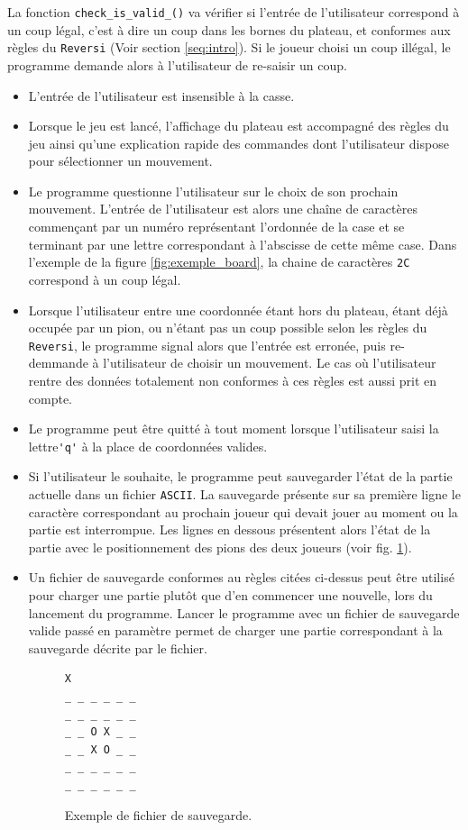 \documentclass[10pt,a4paper]{article}
\begin{document}
La fonction \verb!check_is_valid_()! va vérifier si l'entrée de l'utilisateur correspond à un coup légal, c'est à dire un coup dans les bornes du plateau, et conformes aux règles du \verb!Reversi! (Voir section \ref{seq:intro}). Si le joueur choisi un coup illégal, le programme demande alors à l'utilisateur de re-saisir un coup.\\

\begin{itemize}
\item L'entrée de l'utilisateur est insensible à la casse.
\item Lorsque le jeu est lancé, l'affichage du plateau est accompagné des règles du jeu ainsi qu'une explication rapide des commandes dont l'utilisateur dispose pour sélectionner un mouvement.
\item Le programme questionne l'utilisateur sur le choix de son prochain mouvement. L'entrée de l'utilisateur est alors une chaîne de caractères commençant par un numéro représentant l'ordonnée de la case et se terminant par une lettre correspondant à l'abscisse de cette même case. Dans l'exemple de la figure \ref{fig:exemple_board}, la chaine de caractères \verb!2C! correspond à un coup légal.
\item Lorsque l'utilisateur entre une coordonnée étant hors du plateau, étant déjà occupée par un pion, ou n'étant pas un coup possible selon les règles du \verb!Reversi!, le programme signal alors que l'entrée est erronée, puis re-demmande à l'utilisateur de choisir un mouvement. Le cas où l'utilisateur rentre des données totalement non conformes à ces règles est aussi prit en compte.
\item Le programme peut être quitté à tout moment lorsque l'utilisateur saisi la lettre\verb!'q'! à la place de coordonnées valides.
\item Si l'utilisateur le souhaite, le programme peut sauvegarder l'état de la partie actuelle dans un fichier \verb!ASCII!. La sauvegarde présente sur sa première ligne le caractère correspondant au prochain joueur qui devait jouer au moment ou la partie est interrompue. Les lignes en dessous présentent alors l'état de la partie avec le positionnement des pions des deux joueurs (voir fig. \ref{fig:exemple_save}).
\item Un fichier de sauvegarde conformes au règles citées ci-dessus peut être utilisé pour charger une partie plutôt que d'en commencer une nouvelle, lors du lancement du programme.  Lancer le programme avec un fichier de sauvegarde valide passé en paramètre permet de charger une partie correspondant à la sauvegarde décrite par le fichier.
\begin{figure}[H]    
\centering
\begin{BVerbatim}
X
_ _ _ _ _ _
_ _ _ _ _ _
_ _ O X _ _
_ _ X O _ _
_ _ _ _ _ _
_ _ _ _ _ _ 
\end{BVerbatim}
\caption {Exemple de fichier de sauvegarde.\label{fig:exemple_save}}
\end{figure}


\end{itemize}
\end{document}
